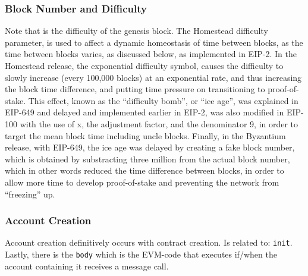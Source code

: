 \documentclass[10pt,letterpaper,leqno,bibliography=totoc]{scrartcl}
\newenvironment{alphafootnotes}
{\par\edef\savedfootnotenumber{\number\value{footnote}}
\renewcommand{\thefootnote}{\alph{footnote}}
\setcounter{footnote}{0}}
{\par\setcounter{footnote}{\savedfootnotenumber}}
\begin{document}
\begin{alphafootnotes}
\begin{multicols*}{2}
					\subsubsection{Block Number and Difficulty}
						Note that is the difficulty of the genesis block. The Homestead difficulty parameter, is used to affect a dynamic homeostasis of time between blocks, as the time between blocks varies, as discussed below, as implemented in EIP-2. In the Homestead release, the exponential difficulty symbol, causes the difficulty to slowly increase (every 100,000 blocks) at an exponential rate, and thus increasing the block time difference, and putting time pressure on transitioning to proof-of-stake. This effect, known as the “difficulty bomb”, or “ice age”, was explained in EIP-649 and delayed and implemented earlier in EIP-2, was also modified in EIP-100 with the use of x, the adjustment factor, and the denominator 9, in order to target the mean block time including uncle blocks. Finally, in the Byzantium release, with EIP-649, the ice age was delayed by creating a fake block number, which is obtained by substracting three million from the actual block number, which in other words reduced the time difference between blocks, in order to allow more time to develop proof-of-stake and preventing the network from “freezing” up.\supercite{Wood2017}
					
					\subsubsection{Account Creation} 

					Account creation definitively occurs with contract creation. Is related to: \texttt{init}. Lastly, there is the \texttt{body} which is the EVM-code that executes if/when the account containing it receives a message call.


\end{multicols*}
\end{alphafootnotes}
\end{document}
